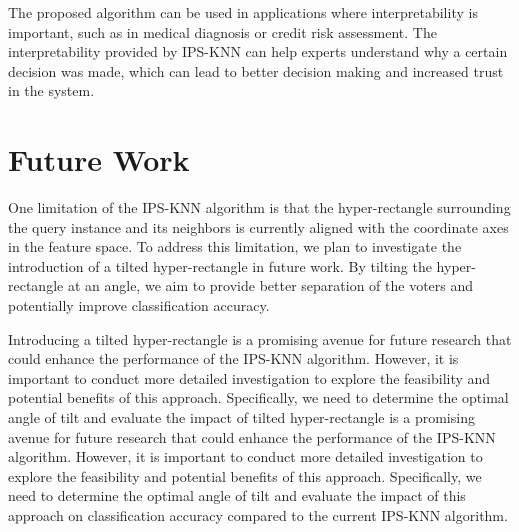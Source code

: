 \documentclass[
]{ceurart}
\begin{document}
The proposed algorithm can be used in applications where interpretability is important, such as in medical diagnosis or credit risk assessment. The interpretability provided by IPS-KNN can help experts understand why a certain decision was made, which can lead to better decision making and increased trust in the system. 


\section{Future Work}
One limitation of the IPS-KNN algorithm is that the hyper-rectangle surrounding the query instance and its neighbors is currently aligned with the coordinate axes in the feature space. To address this limitation, we plan to investigate the introduction of a tilted hyper-rectangle in future work. By tilting the hyper-rectangle at an angle, we aim to provide better separation of the voters and potentially improve classification accuracy.

Introducing a tilted hyper-rectangle is a promising avenue for future research that could enhance the performance of the IPS-KNN algorithm. However, it is important to conduct more detailed investigation to explore the feasibility and potential benefits of this approach. Specifically, we need to determine the optimal angle of tilt and evaluate the impact of tilted hyper-rectangle is a promising avenue for future research that could enhance the performance of the IPS-KNN algorithm. However, it is important to conduct more detailed investigation to explore the feasibility and potential benefits of this approach. Specifically, we need to determine the optimal angle of tilt and evaluate the impact of this approach on classification accuracy compared to the current IPS-KNN algorithm.


\end{document}
